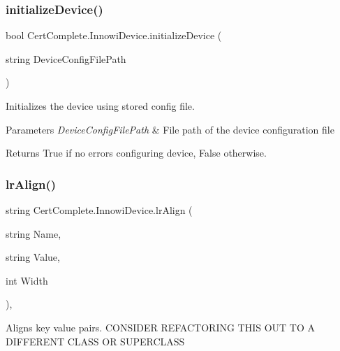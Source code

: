 \subsubsection{\texorpdfstring{initialize\+Device()}{initializeDevice()}}
{\footnotesize\ttfamily bool Cert\+Complete.\+Innowi\+Device.\+initialize\+Device (\begin{DoxyParamCaption}\item[{string}]{Device\+Config\+File\+Path }\end{DoxyParamCaption})\hspace{0.3cm}{\ttfamily [inline]}}



Initializes the device using stored config file. 


\begin{DoxyParams}{Parameters}
{\em Device\+Config\+File\+Path} & File path of the device configuration file\\
\hline
\end{DoxyParams}
\begin{DoxyReturn}{Returns}
True if no errors configuring device, False otherwise.
\end{DoxyReturn}
\mbox{\label{class_cert_complete_1_1_innowi_device_ae438dadbc675ddfb9a8bbf48c0a143f7}} 
\subsubsection{\texorpdfstring{lr\+Align()}{lrAlign()}}
{\footnotesize\ttfamily string Cert\+Complete.\+Innowi\+Device.\+lr\+Align (\begin{DoxyParamCaption}\item[{string}]{Name,  }\item[{string}]{Value,  }\item[{int}]{Width }\end{DoxyParamCaption})\hspace{0.3cm}{\ttfamily [inline]}, {\ttfamily [private]}}



Aligns key value pairs. C\+O\+N\+S\+I\+D\+ER R\+E\+F\+A\+C\+T\+O\+R\+I\+NG T\+H\+IS O\+UT TO A D\+I\+F\+F\+E\+R\+E\+NT C\+L\+A\+SS OR S\+U\+P\+E\+R\+C\+L\+A\+SS 


